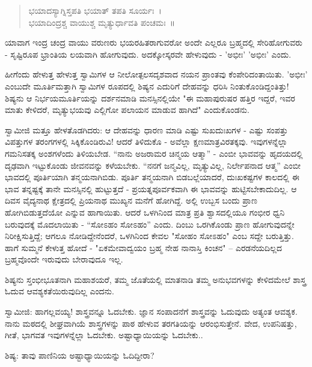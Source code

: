 \begin{verse}
ಭಯಾದಸ್ಯಾಗ್ನಿಸ್ತಪತಿ ಭಯಾತ್ ತಪತಿ ಸೂರ್ಯಃ~।\\ಭಯಾದಿಂದ್ರಶ್ಚ ವಾಯುಶ್ಚ ಮೃತ್ಯುರ್ಧಾವತಿ ಪಂಚಮಃ~॥
\end{verse}

ಯಾವಾಗ ಇಂದ್ರ ಚಂದ್ರ ವಾಯು ವರುಣರು ಭಯರಹಿತರಾಗುವರೋ ಅಂದೇ ಎಲ್ಲರೂ ಬ್ರಹ್ಮದಲ್ಲಿ ಸೇರಿಹೋಗುವರು - ಸೃಷ್ಟಿರೂಪ ಭ್ರಾಂತಿಯ ಲಯವಾಗಿ ಹೋಗುವುದು. ಅದಕ್ಕೋಸ್ಕರವೇ ಹೇಳುವುದು - 'ಅಭೀಃ' 'ಅಭೀಃ' ಎಂದು.

ಹೀಗೆಂದು ಹೇಳುತ್ತ ಹೇಳುತ್ತ ಸ್ವಾಮಿಗಳ ಆ ನೀಲೋತ್ಪಲಸದೃಶವಾದ ನಯನ ಪ್ರಾಂತವು ಕೆಂಪೇರಿದಂತಾಯಿತು. 'ಅಭೀಃ' ಎಂಬುದೇ ಮೂರ್ತಿಮತ್ತಾಗಿ ಸ್ವಾಮಿಗಳ ರೂಪದಲ್ಲಿ ಶಿಷ್ಯನ ಎದುರಿಗೆ ದೇಹವನ್ನು ಧರಿಸಿ ನಿಂತುಕೊಂಡಿದ್ದಂತಿತ್ತು! ಶಿಷ್ಯನು ಆ ನಿರ್ಭಯಮೂರ್ತಿಯನ್ನು ದರ್ಶನಮಾಡಿ ಮನಸ್ಸಿನಲ್ಲಿಯೇ "ಈ ಮಹಾಪುರುಷರ ಹತ್ತಿರ ಇದ್ದರೆ, ಇವರ ಮಾತು ಕೇಳಿದರೆ, ಮೃತ್ಯುಭಯವು ಎಲ್ಲಿಗೋ ಪಲಾಯನ ಮಾಡುವ ಹಾಗಿದೆ" ಎಂದುಕೊಂಡನು.

ಸ್ವಾಮೀಜಿ ಮತ್ತೂ ಹೇಳತೊಡಗಿದರು: ಆ ದೇಹವನ್ನು ಧಾರಣ ಮಾಡಿ ಎಷ್ಟು ಸುಖದುಃಖಗಳ - ಎಷ್ಟು ಸಂಪತ್ತು ವಿಪತ್ತುಗಳ ತರಂಗಗಳಲ್ಲಿ ಸಿಕ್ಕಿಕೊಂಡಿರುವಿ! ಆದರೆ ತಿಳಿದುಕೊ - ಅವೆಲ್ಲಾ ಕ್ಷಣಮಾತ್ರವಿರತಕ್ಕವು. ಇವುಗಳನ್ನೆಲ್ಲಾ ಗಮನಿಸತಕ್ಕ ಅಂಶಗಳೆಂದು ತಿಳಿಯಬೇಡ. “ನಾನು ಅಜರಾಮರ ಚಿನ್ಮಯ ಆತ್ಮಾ” - ಎಂಬೀ ಭಾವವನ್ನು ಹೃದಯದಲ್ಲಿ ದೃಢವಾಗಿ ಇಟ್ಟುಕೊಂಡು ಜೀವನವನ್ನು ಕಳೆಯಬೇಕು. “ನನಗೆ ಜನ್ಮವಿಲ್ಲ, ಮೃತ್ಯುವಿಲ್ಲ, ನಿರ್ಲೇಪನಾದ ಆತ್ಮ” ಎಂಬೀ ಭಾವದಲ್ಲಿ ಪೂರ್ತಿಯಾಗಿ ತನ್ಮಯನಾಗಿಬಿಡು. ಪೂರ್ತಿ ತನ್ಮಯನಾಗಿ ಬಿಡಬಲ್ಲೆಯಾದರೆ, ದುಃಖಕಷ್ಟಗಳ ಕಾಲದಲ್ಲಿ ಈ ಭಾವ ತನ್ನಷ್ಟಕ್ಕೆ ತಾನೇ ಮನಸ್ಸಿನಲ್ಲಿ ಹುಟ್ಟುತ್ತದೆ - ಪ್ರಯತ್ನಪೂರ್ವಕವಾಗಿ ಈ ಭಾವವನ್ನು ಹುಟ್ಟಿಸಬೇಕಾದುದಿಲ್ಲ. ಆ ದಿವಸ ವೈದ್ಯನಾಥ ಕ್ಷೇತ್ರದಲ್ಲಿ ಪ್ರಿಯನಾಥ ಮುಖ್ಯನ ಮನೆಗೆ ಹೋಗಿದ್ದೆ. ಅಲ್ಲಿ ಉಬ್ಬಸ ಬಂದು ಪ್ರಾಣ ಹೋಗಿಬಿಡುತ್ತದೆಯೋ ಎನ್ನುವ ಹಾಗಾಯಿತು. ಆದರೆ ಒಳಗಿನಿಂದ ಮಾತ್ರ ಪ್ರತಿ ಶ್ವಾಸದಲ್ಲಿಯೂ ಗಂಭೀರ ಧ್ವನಿ ಬರುವುದಕ್ಕೆ ಮೊದಲಾಯಿತು - “ಸೋಽಹಂ ಸೋಽಹಂ” ಎಂದು. ದಿಂಬು ಒರಗಿಕೊಂಡು ಪ್ರಾಣ ಹೋಗುವುದನ್ನೇ ನಿರೀಕ್ಷಿಸುತ್ತಿದ್ದೆ; ಆಗಲೂ ನೋಡಿದ್ದೇನೆಂದರೆ, ಒಳಗಿನಿಂದ ಕೇವಲ "ಸೋಹಂ ಸೋಽಹಂ" ಎಂಬ ಸದ್ದೇ ಬರುತ್ತಿತ್ತು. ಹಾಗೆ ಸುಮ್ಮನೆ ಕೇಳುತ್ತ ಹೋದೆ - "ಏಕಮೇವಾದ್ವಯಂ ಬ್ರಹ್ಮ ನೇಹ ನಾನಾಸ್ತಿ ಕಿಂಚನ" – ಎರಡನೆಯದಿಲ್ಲದ ಬ್ರಹ್ಮವೊಂದೇ ಇರುವುದು ಬೇರಾವುದೂ ಇಲ್ಲ.

ಶಿಷ್ಯನು ಸ್ತಂಭೀಭೂತನಾಗಿ ಮಹಾಶಯರೆ, ತಮ್ಮ ಜೊತೆಯಲ್ಲಿ ಮಾತನಾಡಿ ತಮ್ಮ ಅನುಭವಗಳನ್ನು ಕೇಳಿದಮೇಲೆ ಶಾಸ್ತ್ರ ಓದುವ ಆವಶ್ಯಕತೆಯಿರುವುದಿಲ್ಲ ಎಂದನು.

ಸ್ವಾಮೀಜಿ: ಹಾಗಲ್ಲವಯ್ಯ! ಶಾಸ್ತ್ರವನ್ನೂ ಓದಬೇಕು. ಜ್ಞಾನ ಸಂಪಾದನೆಗೆ ಶಾಸ್ತ್ರವನ್ನು ಓದುವುದು ಅತ್ಯಂತ ಆವಶ್ಯಕ. ನಾನು ಮಠದಲ್ಲಿ ಶೀಘ್ರವಾಗಿಯೆ ಶಾಸ್ತ್ರಗಳನ್ನು ಪಾಠ ಹೇಳುವ ತರಗತಿಯನ್ನು ಆರಂಭಿಸುತ್ತೇನೆ. ವೇದ, ಉಪನಿಷತ್ತು, ಗೀತೆ, ಭಾಗವತ ಇವುಗಳನ್ನೆಲ್ಲಾ ಓದಬೇಕು. ಅಷ್ಟಾಧ್ಯಾಯಿಯನ್ನು ಓದಬೇಕು..

ಶಿಷ್ಯ: ತಾವು ಪಾಣಿನಿಯ ಅಷ್ಟಾಧ್ಯಾಯಿಯನ್ನು ಓದಿದ್ದೀರಾ?

